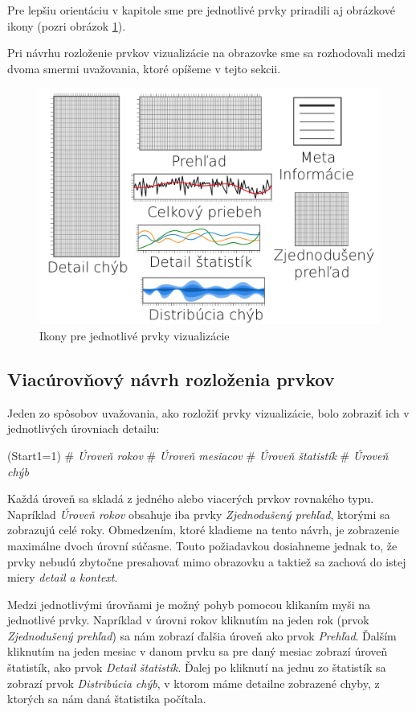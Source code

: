 \noindent Pre lepšiu orientáciu v kapitole sme pre jednotlivé prvky priradili aj obrázkové ikony (pozri obrázok \ref{fig:designicons}). 
 
Pri návrhu rozloženie prvkov vizualizácie na obrazovke sme sa rozhodovali medzi dvoma smermi uvažovania, ktoré opíšeme v tejto sekcii. 

\begin{figure}
	\centering
	\includegraphics[width = 4.5in]{designicons}
	\caption{Ikony pre jednotlivé prvky vizualizácie}
	\label{fig:designicons}
\end{figure}


\subsection{Viacúrovňový návrh rozloženia prvkov}
Jeden zo spôsobov uvažovania, ako rozložiť prvky vizualizácie, bolo zobraziť ich v jednotlivých úrovniach detailu: 
\begin{easylist}
	\ListProperties(Start1=1)
	# \textit{Úroveň rokov}
	# \textit{Úroveň mesiacov}
	# \textit{Úroveň štatistík}
	# \textit{Úroveň chýb} 
\end{easylist}

\noindent Každá úroveň sa skladá z jedného alebo viacerých prvkov rovnakého typu. Napríklad \textit{Úroveň rokov} obsahuje iba prvky \textit{Zjednodušený prehľad}, ktorými sa zobrazujú celé roky. Obmedzením, ktoré kladieme na tento návrh, je zobrazenie maximálne dvoch úrovní súčasne. Touto požiadavkou dosiahneme jednak to, že prvky nebudú zbytočne presahovať mimo obrazovku a taktiež sa zachová do istej miery \textit{detail a kontext}. 

Medzi jednotlivými úrovňami je možný pohyb pomocou klikaním myši na jednotlivé prvky. Napríklad v úrovni rokov kliknutím na jeden rok (prvok \textit{Zjednodušený prehľad}) sa nám zobrazí ďalšia úroveň ako prvok \textit{Prehľad}. Ďalším kliknutím na jeden mesiac v danom prvku sa pre daný mesiac zobrazí úroveň štatistík, ako prvok \textit{Detail štatistík}. Ďalej po kliknutí na jednu zo štatistík sa zobrazí prvok \textit{Distribúcia chýb}, v ktorom máme detailne zobrazené chyby, z ktorých sa nám daná štatistika počítala.

